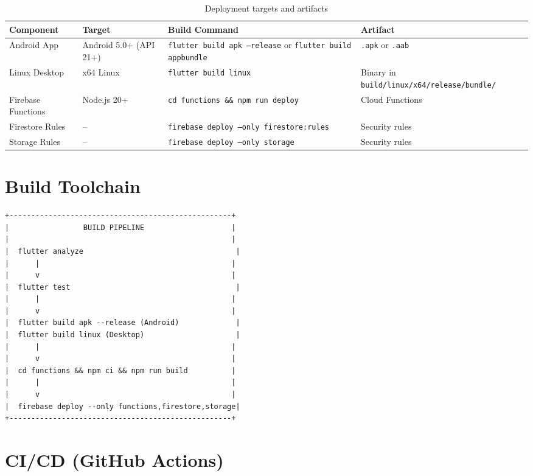 \documentclass[12pt,a4paper,openany]{report}
\begin{document}
\begin{table}[H]
\centering
\caption{Deployment targets and artifacts}
\label{tab:deployment}
\begin{tabular}{llll}
\toprule
\textbf{Component} & \textbf{Target} & \textbf{Build Command} & \textbf{Artifact} \\
\midrule
Android App & Android 5.0+ (API 21+) & \texttt{flutter build apk --release} or \texttt{flutter build appbundle} & \texttt{.apk} or \texttt{.aab} \\
Linux Desktop & x64 Linux & \texttt{flutter build linux} & Binary in \texttt{build/linux/x64/release/bundle/} \\
Firebase Functions & Node.js 20+ & \texttt{cd functions \&\& npm run deploy} & Cloud Functions \\
Firestore Rules & -- & \texttt{firebase deploy --only firestore:rules} & Security rules \\
Storage Rules & -- & \texttt{firebase deploy --only storage} & Security rules \\
\bottomrule
\end{tabular}
\end{table}

\section{Build Toolchain}

\begin{verbatim}
+---------------------------------------------------+
|                 BUILD PIPELINE                    |
|                                                   |
|  flutter analyze                                   |
|      |                                            |
|      v                                            |
|  flutter test                                      |
|      |                                            |
|      v                                            |
|  flutter build apk --release (Android)             |
|  flutter build linux (Desktop)                     |
|      |                                            |
|      v                                            |
|  cd functions && npm ci && npm run build          |
|      |                                            |
|      v                                            |
|  firebase deploy --only functions,firestore,storage|
+---------------------------------------------------+
\end{verbatim}

\section{CI/CD (GitHub Actions)}
\end{document}
